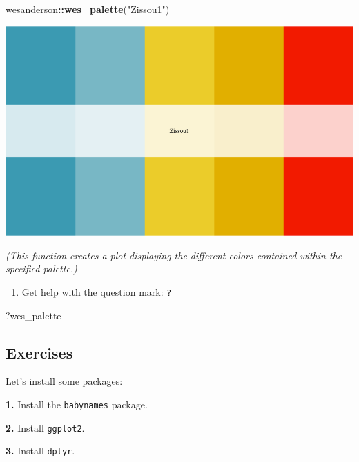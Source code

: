 \documentclass[
]{book}
\newenvironment{Shaded}{\begin{snugshade}}{\end{snugshade}}
\newcommand{\KeywordTok}[1]{\textcolor[rgb]{0.13,0.29,0.53}{\textbf{#1}}}
\newcommand{\NormalTok}[1]{#1}
\newcommand{\OperatorTok}[1]{\textcolor[rgb]{0.81,0.36,0.00}{\textbf{#1}}}
\newcommand{\StringTok}[1]{\textcolor[rgb]{0.31,0.60,0.02}{#1}}
\providecommand{\tightlist}{%
  \setlength{\itemsep}{0pt}\setlength{\parskip}{0pt}}
\begin{document}
\begin{Shaded}
\begin{Highlighting}[]
\NormalTok{wesanderson}\OperatorTok{::}\KeywordTok{wes_palette}\NormalTok{(}\StringTok{"Zissou1"}\NormalTok{)}
\end{Highlighting}
\end{Shaded}

\includegraphics{figures/unnamed-chunk-206-2.pdf}

\emph{(This function creates a plot displaying the different colors contained within the specified palette.)}

\begin{enumerate}
\def\labelenumi{\arabic{enumi}.}
\setcounter{enumi}{3}
\tightlist
\item
  Get help with the question mark: \texttt{?}
\end{enumerate}

\begin{Shaded}
\begin{Highlighting}[]
\NormalTok{?wes_palette}
\end{Highlighting}
\end{Shaded}

\hypertarget{exercises-6}{%
\subsection*{Exercises}\label{exercises-6}}

Let's install some packages:

\textbf{1.} Install the \texttt{babynames} package.

\textbf{2.} Install \texttt{ggplot2}.

\textbf{3.} Install \texttt{dplyr}.
\end{document}
